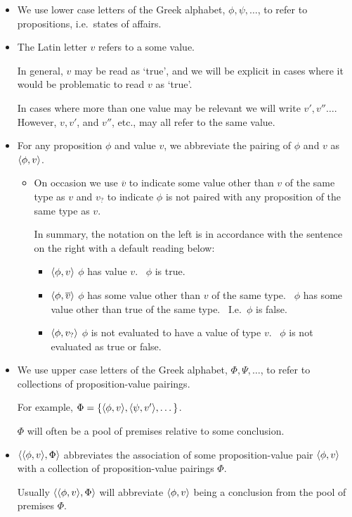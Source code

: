 \begin{note}
  \begin{itemize}
  \item
    We use lower case letters of the Greek alphabet, \(\phi, \psi, \dots\), to refer to propositions, i.e.\ states of affairs.
  \item
    The Latin letter \(v\) refers to a some value.

    In general, \(v\) may be read as `true', and we will be explicit in cases where it would be problematic to read \(v\) as `true'.

    In cases where more than one value may be relevant we will write \(v', v'' \dots\).
    However, \(v, v'\), and \(v''\), etc., may all refer to the same value.
  \item
    For any proposition \(\phi\) and value \(v\), we abbreviate the pairing of \(\phi\) and \(v\) as \(\langle \phi, v \rangle\).
    \begin{itemize}
    \item
      On occasion we use \(\overline{v}\) to indicate some value other than \(v\) of the same type as \(v\) and \(v_{?}\) to indicate \(\phi\) is not paired with any proposition of the same type as \(v\).

      In summary, the notation on the left is in accordance with the sentence on the right with a default reading below:
      \begin{itemize}
      \item
        \(\langle \phi, v \rangle\) \hfill \(\phi\) has value \(v\).%
        \newline
        \mbox{ }\hfill \(\phi\) is true.
      \item
        \(\langle \phi, \overline{v} \rangle\) \hfill \(\phi\) has some value other than \(v\) of the same type.%
        \newline
        \mbox{ }\hfill \(\phi\) has some value other than true of the same type.%
        \newline
        \mbox{ }\hfill I.e.\ \(\phi\) is false.
      \item
        \(\langle \phi, v_{?} \rangle\) \hfill \(\phi\) is not evaluated to have a value of type \(v\).%
        \newline
        \mbox{ }\hfill \(\phi\) is not evaluated as true or false.
      \end{itemize}
    \end{itemize}
  \item
    We use upper case letters of the Greek alphabet, \(\Phi, \Psi, \dots\), to refer to collections of proposition-value pairings.

    For example, \(\Phi = \{ \langle \phi, v \rangle, \langle \psi, v' \rangle, \dots \}\).

    \(\Phi\) will often be a pool of premises relative to some conclusion.
  \item
    \(\langle \langle \phi, v \rangle, \Phi \rangle\) abbreviates the association of some proposition-value pair \(\langle \phi, v \rangle\) with a collection of proposition-value pairings \(\Phi\).

    Usually \(\langle \langle \phi, v \rangle, \Phi \rangle\) will abbreviate \(\langle \phi, v \rangle\) being a conclusion from the pool of premises \(\Phi\).
  \end{itemize}
\end{note}


